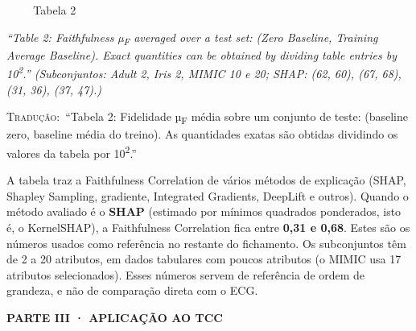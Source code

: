 \documentclass[11pt,a4paper]{article}
\newcommand{\pagechip}[1]{{\setlength{\fboxsep}{1.5pt}\colorbox{cAcc}{\textcolor{white}{\scriptsize\texttt{#1}}}}}
\newcommand{\partbar}[1]{\par\vspace{1.2em}\noindent\colorbox{black!80}{\parbox{\dimexpr\linewidth-2\fboxsep}{\color{white}\bfseries\sffamily\MakeUppercase{#1}}}\par\vspace{0.4em}}
\newenvironment{origquote}{\par\itshape\small}{\par}
\newenvironment{tradquote}{\par\small\textsc{Tradução:}\ }{\par}
\newcommand{\explab}[1]{\par\smallskip{\small\color{cAcc}\textbf{\MakeUppercase{#1}}}\par}
\begin{document}
\begin{citacard}{\pagechip{p. 6} Tabela 2}
\begin{origquote}“Table 2: Faithfulness µ\textsubscript{F} averaged over a test set: (Zero Baseline, Training Average Baseline). Exact quantities can be obtained by dividing table entries by 10\textsuperscript{2}.” (Subconjuntos: Adult 2, Iris 2, MIMIC 10 e 20; SHAP: (62, 60), (67, 68), (31, 36), (37, 47).)\end{origquote}
\begin{tradquote}“Tabela 2: Fidelidade µ\textsubscript{F} média sobre um conjunto de teste: (baseline zero, baseline média do treino). As quantidades exatas são obtidas dividindo os valores da tabela por 10\textsuperscript{2}.”\end{tradquote}
\explab{Explicação}
A tabela traz a Faithfulness Correlation de vários métodos de explicação (SHAP, Shapley Sampling, gradiente, Integrated Gradients, DeepLift e outros). Quando o método avaliado é o \textbf{SHAP} (estimado por mínimos quadrados ponderados, isto é, o KernelSHAP), a Faithfulness Correlation fica entre \textbf{0,31 e 0,68}. Estes são os números usados como referência no restante do fichamento. Os subconjuntos têm de 2 a 20 atributos, em dados tabulares com poucos atributos (o MIMIC usa 17 atributos selecionados). Esses números servem de referência de ordem de grandeza, e não de comparação direta com o ECG.
\end{citacard}

\partbar{Parte III · Aplicação ao TCC}
\end{document}

